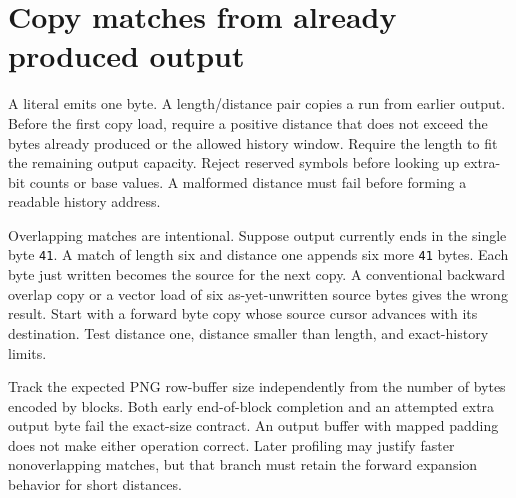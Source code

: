 \section{Copy matches from already produced output}
A literal emits one byte. A length/distance pair copies a run from earlier output.
Before the first copy load, require a positive distance that does not exceed the
bytes already produced or the allowed history window. Require the length to fit the
remaining output capacity. Reject reserved symbols before looking up extra-bit counts
or base values. A malformed distance must fail before forming a readable history address.

Overlapping matches are intentional. Suppose output currently ends in the single
byte \texttt{41}. A match of length six and distance one appends six more \texttt{41}
bytes. Each byte just written becomes the source for the next copy. A conventional
backward overlap copy or a vector load of six as-yet-unwritten source bytes gives the
wrong result. Start with a forward byte copy whose source cursor advances with its
destination. Test distance one, distance smaller than length, and exact-history limits.

Track the expected PNG row-buffer size independently from the number of bytes encoded
by blocks. Both early end-of-block completion and an attempted extra output byte fail
the exact-size contract. An output buffer with mapped padding does not make either
operation correct. Later profiling may justify faster nonoverlapping matches, but
that branch must retain the forward expansion behavior for short distances.
